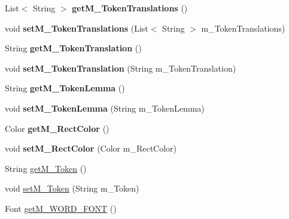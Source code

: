 \begin{DoxyCompactItemize}
List$<$ String $>$ {\bfseries get\+M\+\_\+\+Token\+Translations} ()
\item 
\mbox{\label{classtranslation_visualization_1_1_item_a6cebc90b659452281525dd23ca4660b5}} 
void {\bfseries set\+M\+\_\+\+Token\+Translations} (List$<$ String $>$ m\+\_\+\+Token\+Translations)
\item 
\mbox{\label{classtranslation_visualization_1_1_item_a543d252395338c0a732304911b48bb0a}} 
String {\bfseries get\+M\+\_\+\+Token\+Translation} ()
\item 
\mbox{\label{classtranslation_visualization_1_1_item_adda59b585ff2c8fed4d7c4529db6839e}} 
void {\bfseries set\+M\+\_\+\+Token\+Translation} (String m\+\_\+\+Token\+Translation)
\item 
\mbox{\label{classtranslation_visualization_1_1_item_aff2a648620e7413b2b7301c7ead2d254}} 
String {\bfseries get\+M\+\_\+\+Token\+Lemma} ()
\item 
\mbox{\label{classtranslation_visualization_1_1_item_a001e8b452d82620bf4d0e235d1aedbe6}} 
void {\bfseries set\+M\+\_\+\+Token\+Lemma} (String m\+\_\+\+Token\+Lemma)
\item 
\mbox{\label{classtranslation_visualization_1_1_item_a254fb3658b38159152fb4463f29a078a}} 
Color {\bfseries get\+M\+\_\+\+Rect\+Color} ()
\item 
\mbox{\label{classtranslation_visualization_1_1_item_a0f5aa801c405741d5add00b615d80338}} 
void {\bfseries set\+M\+\_\+\+Rect\+Color} (Color m\+\_\+\+Rect\+Color)
\item 
String \hyperlink{classtranslation_visualization_1_1_item_aad84417a4414b6822d0f88445ece094e}{get\+M\+\_\+\+Token} ()
\item 
void \hyperlink{classtranslation_visualization_1_1_item_a84caeb3f91879014422a80f85e603f52}{set\+M\+\_\+\+Token} (String m\+\_\+\+Token)
\item 
Font \hyperlink{classtranslation_visualization_1_1_item_afe97eb2bcc6be85edbcf040024ec30cd}{get\+M\+\_\+\+W\+O\+R\+D\+\_\+\+F\+O\+NT} ()

\end{DoxyCompactItemize}
